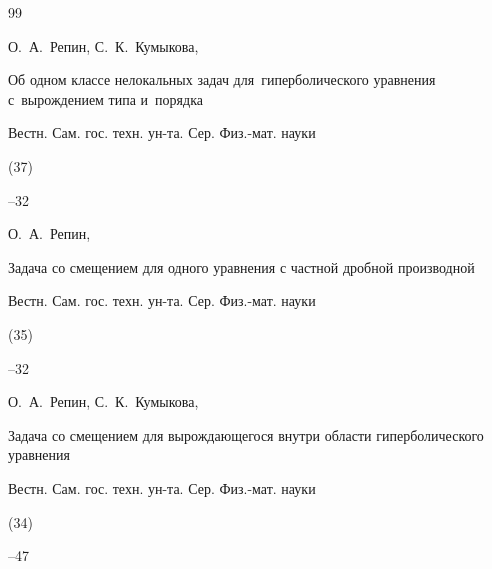 \begin{thebibliography}{99}







\by О.~А.~Репин, С.~К.~Кумыкова,

\paper Об одном классе нелокальных задач для~гиперболического уравнения с~вырождением типа и~порядка

\jour Вестн. Сам. гос. техн. ун-та. Сер. Физ.-мат. науки


(37)

--32









\by О.~А.~Репин,

\paper Задача со смещением для одного уравнения с частной дробной производной

\jour Вестн. Сам. гос. техн. ун-та. Сер. Физ.-мат. науки


(35)

--32







\by О.~А.~Репин, С.~К.~Кумыкова,

\paper Задача со смещением для вырождающегося внутри области гиперболического уравнения

\jour Вестн. Сам. гос. техн. ун-та. Сер. Физ.-мат. науки


(34)

--47





\end{thebibliography}
